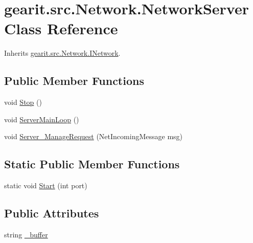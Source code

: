 \hypertarget{classgearit_1_1src_1_1_network_1_1_network_server}{\section{gearit.\+src.\+Network.\+Network\+Server Class Reference}
\label{classgearit_1_1src_1_1_network_1_1_network_server}
}


Inherits \hyperlink{classgearit_1_1src_1_1_network_1_1_i_network}{gearit.\+src.\+Network.\+I\+Network}.

\subsection*{Public Member Functions}
\begin{DoxyCompactItemize}
\item 
void \hyperlink{classgearit_1_1src_1_1_network_1_1_network_server_afa35d0084398b49eca5cd4ad48dd34b8}{Stop} ()
\item 
void \hyperlink{classgearit_1_1src_1_1_network_1_1_network_server_a293b488293014a5e13a9613eafe2cc4b}{Server\+Main\+Loop} ()
\item 
void \hyperlink{classgearit_1_1src_1_1_network_1_1_network_server_a7b773b09e78fa32873b2b4df6b2665e0}{Server\+\_\+\+Manage\+Request} (Net\+Incoming\+Message msg)
\end{DoxyCompactItemize}
\subsection*{Static Public Member Functions}
\begin{DoxyCompactItemize}
\item 
static void \hyperlink{classgearit_1_1src_1_1_network_1_1_network_server_a4a37120c3865fd4edf4a70590efc9499}{Start} (int port)
\end{DoxyCompactItemize}
\subsection*{Public Attributes}
\begin{DoxyCompactItemize}
\item 
string \hyperlink{classgearit_1_1src_1_1_network_1_1_network_server_aff0349d8a14eb10ceb574a5137532d8c}{\+\_\+buffer}
\end{DoxyCompactItemize}
